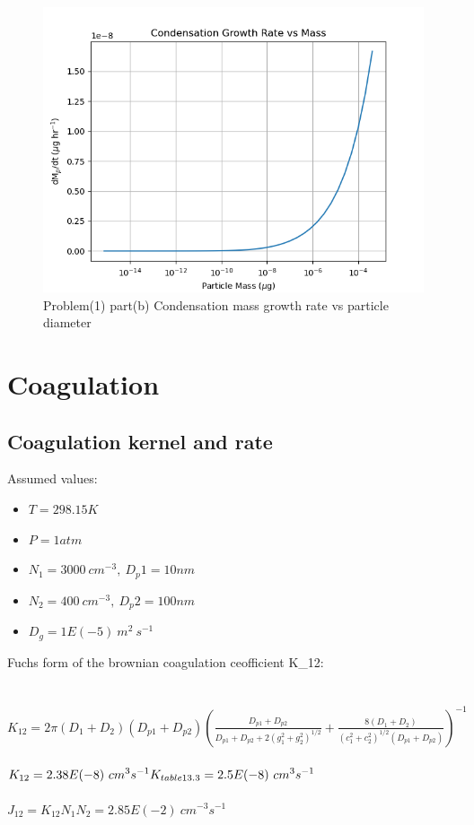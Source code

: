 \documentclass[12pt]{article}
\begin{document}
\begin{figure}\label{fig:problem-1-b-2}
    \begin{center}
        \includegraphics[width=5in]{hw2_pr1_2_condensation_growth_rate_vs_mass.png}
        \caption{Problem(1) part(b) Condensation mass growth rate vs particle diameter}
    \end{center}
\end{figure}




\newpage
\section{Coagulation}\label{sec:problem-2}
\subsection{Coagulation kernel and rate}\label{subsec:problem-2-a}
Assumed values:
\begin{itemize}
    \item $T = 298.15K$
    \item $P = 1atm$
    \item $N_1 = 3000\ cm^{-3},\ D_p1 = 10nm $
    \item $N_2 = 400\ cm^{-3},\ D_p2 = 100nm $
    \item $D_g = 1E(-5)\ m^2\ s^{-1}$
\end{itemize}
Fuchs form of the brownian coagulation ceofficient K_{12}: \\ \\
\\
$\displaystyle K_{12} = 2\pi(D_1+D_2)(D_{p1}+D_{p2})(\frac{D_{p1}+D_{p2}}{D_{p1}+D_{p2}+2(g_1^2+g_2^2)^{1/2}}+\frac{8(D_1+D_2)}{(c_1^2+c_2^2)^{1/2}(D_{p1}+D_{p2})})^{-1}$
\\ \\
$\displaystyle K_{12} = 2.38E(-8)\  cm^3 s^{-1}
\\ \\
K_{table13.3}=2.5E(-8)\ cm^3 s^{-1}$
\\ \\
$J_{12} = K_{12}N_1N_2 = 2.85E(-2)\ cm^{-3} s^{-1}$
\end{document}
